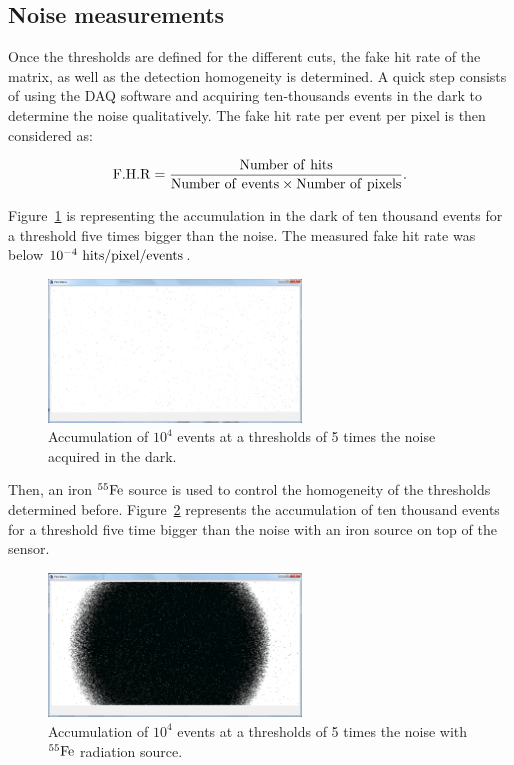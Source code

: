   \subsection{Noise measurements}

  Once the thresholds are defined for the different cuts, the fake hit rate of the matrix, as well as the detection homogeneity is determined.
  A quick step consists of using the \gls{DAQ} software and acquiring ten-thousands events in the dark to determine the noise qualitatively. 
  The fake hit rate per event per pixel is then considered as:

  \begin{equation}
    \rm{F.H.R} = \frac{\rm{Number~of~hits}}{\rm{Number~of~events} \times \rm{Number~of~pixels}}. 
  \end{equation}
  
  Figure~\ref{fig:darkEvents} is representing the accumulation in the dark of ten thousand events for a threshold five times bigger than the noise.
  The measured fake hit rate was below $10^{-4}~\rm{hits/pixel/events}$.

   \begin{figure}[!h]
    \centering
    \includegraphics[width=0.6\textwidth]{Pictures/labTests/dark_10kEvents_not_noisy.png}
    \caption{Accumulation of $10^4$ events at a thresholds of 5 times the noise acquired in the dark.}
    \label{fig:darkEvents}
  \end{figure}

  Then, an iron $^{55}\rm{Fe}$ source is used to control the homogeneity of the thresholds determined before.
  Figure~\ref{fig:fe55} represents the accumulation of ten thousand events for a threshold five time bigger than the noise with an iron source on top of the sensor.
  
  \begin{figure}[!h]
    \centering
    \includegraphics[width=0.6\textwidth]{Pictures/labTests/10kEvents_Fe55_cut5sigma.png}
    \caption{Accumulation of $10^{4}$ events at a thresholds of 5 times the noise with $^{55}\rm{Fe}$ radiation source.}
    \label{fig:fe55}
  \end{figure}


